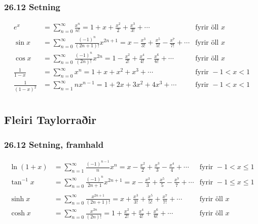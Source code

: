  \subsubsection{26.12 Setning}{\small
\begin{align*}
e^x&=\sum_{n=0}^\infty\frac{x^n}{n!}
    =1+x+\frac{x^2}{2}+\frac{x^3}{3!}
    +\cdots
  &\mbox{fyrir öll }x\\
\sin x&=  \sum_{n=0}^\infty\frac{(-1)^n}{(2n+1)!}x^{2n+1}
    =x-\frac{x^3}{3!}+\frac{x^5}{5!}-\frac{x^7}{7!}+\cdots
     &\mbox{fyrir öll }x\\ 
\cos x&=  \sum_{n=0}^\infty\frac{(-1)^n}{(2n)!}x^{2n}
    =1-\frac{x^2}{2!}+\frac{x^4}{4!}-\frac{x^6}{6!}+\cdots
    &\mbox{fyrir öll }x\\
\frac{1}{1-x}&=\sum_{n=0}^\infty x^n
    =1+x+x^2+x^3+\cdots
&\mbox{fyrir }-1<x<1\\
\frac{1}{(1-x)^2}&=\sum_{n=1}^\infty nx^{n-1}
    =1+2x+3x^2+4x^3+\cdots
&\mbox{fyrir }-1<x<1\\
\end{align*}}



\subsection[t]{Fleiri Taylorraðir}
\subsubsection{26.12 Setning, framhald}{\small
\begin{align*}
\ln(1+x)&=  \sum_{n=1}^\infty\frac{(-1)^{n-1}}{n}x^n
    =x-\frac{x^2}{2}+\frac{x^3}{3}-\frac{x^4}{4}+\cdots
    &\mbox{fyrir }-1<x\leq 1\\
\tan^{-1} x&=  \sum_{n=0}^\infty\frac{(-1)^n}{2n+1}x^{2n+1}
    =x-\frac{x^3}{3}+\frac{x^5}{5}-\frac{x^7}{7}+\cdots
    &\mbox{fyrir }-1\leq x\leq 1\\\\
\sinh x&=  \sum_{n=0}^\infty\frac{x^{2n+1}}{(2n+1)!}
    =x+\frac{x^3}{3!}+\frac{x^5}{5!}+\frac{x^7}{7!}+\cdots
    &\mbox{fyrir öll } x\\
\cosh x&=  \sum_{n=0}^\infty\frac{x^{2n}}{(2n)!}
    =1+\frac{x^2}{2!}+\frac{x^4}{4!}+\frac{x^6}{6!}+\cdots
    &\mbox{fyrir öll } x\\
\end{align*} }
 



\date{28.~nóvember 2011}




